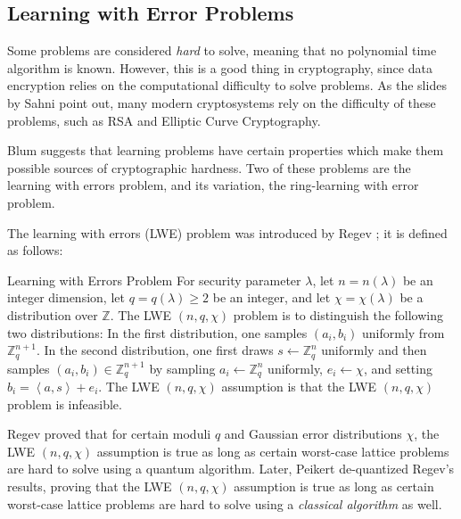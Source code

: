 \subsection{Learning with Error Problems}

Some problems are considered \emph{hard} to solve, meaning that no polynomial time algorithm is known. However, this is a good thing in cryptography, since data encryption relies on the computational difficulty to solve problems. As the slides by Sahni \cite{sahni1999} point out, many modern cryptosystems rely on the difficulty of these problems, such as RSA and Elliptic Curve Cryptography.

Blum \cite{Blum:1993:CPB:646758.759585} suggests that learning problems have certain properties which make them possible sources of cryptographic hardness. Two of these problems are the learning with errors problem, and its variation, the ring-learning with error problem.

The learning with errors (LWE) problem was introduced by Regev \cite{Regev:2005:LLE:1060590.1060603}; it is defined as follows:

\theoremstyle{definition}
\begin{definition}
{Learning with Errors Problem}
For security parameter $\lambda$, let $n = n(\lambda)$ be an integer dimension, let $q=q(\lambda) \geq 2$ be an integer, and let $\chi = \chi(\lambda)$ be a distribution over $\mathbb{Z}$. The LWE $(n, q, \chi)$ problem is to distinguish the following two distributions: In the first distribution, one samples $(a_{i},b_{i})$ uniformly from $\mathbb{Z}_{q}^{n+1}$. In the second distribution, one first draws $s \leftarrow \mathbb{Z}_{q}^{n}$ uniformly and then samples $(a_{i}, b_{i}) \in \mathbb{Z}_{q}^{n+1}$ by sampling $a_{i} \leftarrow \mathbb{Z}_{q}^{n}$ uniformly, $e_{i} \leftarrow \chi$, and setting $b_{i} = \left \langle a,s  \right \rangle + e_{i}$. The LWE $(n, q, \chi)$ assumption is that the LWE $(n, q, \chi)$ problem is infeasible.
\end{definition}

Regev proved that for certain moduli $q$ and Gaussian error distributions $\chi$, the LWE $(n, q, \chi)$ assumption is true as long as certain worst-case lattice problems are hard to solve using a quantum algorithm. Later, Peikert \cite{Peikert:2009:PCW:1536414.1536461} de-quantized Regev's results, proving that the LWE $(n, q, \chi)$ assumption is true as long as certain worst-case lattice problems are hard to solve using a \emph{classical algorithm} as well.

